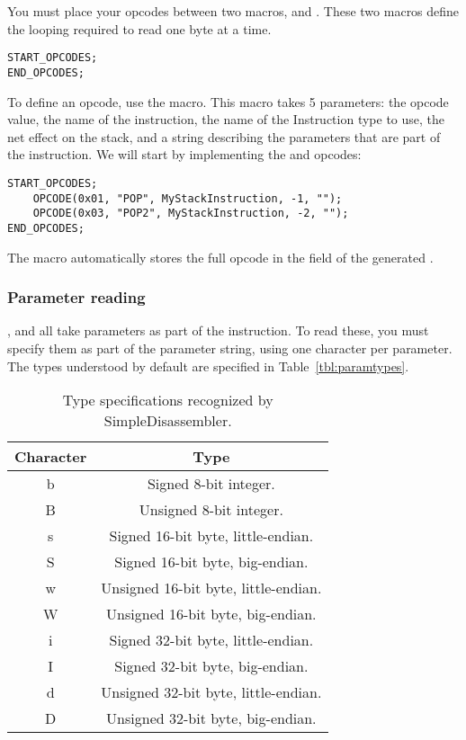 You must place your opcodes between two macros,  and . These two macros define the looping required to read one byte at a time.

\begin{C++}
\begin{lstlisting}
START_OPCODES;
END_OPCODES;
\end{lstlisting}
\end{C++}

To define an opcode, use the  macro. This macro takes 5 parameters: the opcode value, the name of the instruction, the name of the Instruction type to use, the net effect on the stack, and a string describing the parameters that are part of the instruction. We will start by implementing the  and  opcodes:

\begin{C++}
\begin{lstlisting}
START_OPCODES;
	OPCODE(0x01, "POP", MyStackInstruction, -1, "");
	OPCODE(0x03, "POP2", MyStackInstruction, -2, "");
END_OPCODES;
\end{lstlisting}
\end{C++}

The  macro automatically stores the full opcode in the  field of the generated .

\subsubsection{Parameter reading}
,  and  all take parameters as part of the instruction. To read these, you must specify them as part of the parameter string, using one character per parameter. The types understood by default are specified in Table~\vref{tbl:paramtypes}.

\begin{table}[!hpbt]
\centering
\begin{tabular}{c | c}
Character & Type \\
\hline
b & Signed 8-bit integer. \\
B & Unsigned 8-bit integer. \\
s & Signed 16-bit byte, little-endian. \\
S & Signed 16-bit byte, big-endian. \\
w & Unsigned 16-bit byte, little-endian. \\
W & Unsigned 16-bit byte, big-endian. \\
i & Signed 32-bit byte, little-endian. \\
I & Signed 32-bit byte, big-endian. \\
d & Unsigned 32-bit byte, little-endian. \\
D & Unsigned 32-bit byte, big-endian. \\
\end{tabular}
\caption{Type specifications recognized by SimpleDisassembler.}
\label{tbl:paramtypes}
\end{table}

